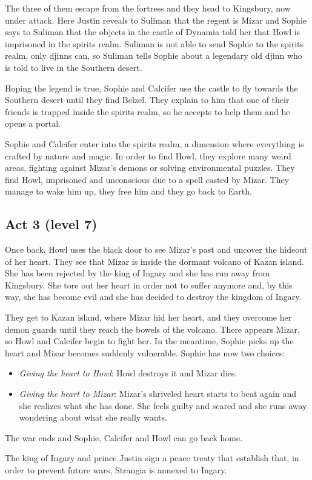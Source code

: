The three of them escape from the fortress and they head to Kingsbury, now under attack. Here Justin reveals to Suliman that the regent is Mizar and Sophie says to Suliman that the objects in the castle of Dynamia told her that Howl is imprisoned in the spirits realm. Suliman is not able to send Sophie to the spirits realm, only djinns can, so Suliman tells Sophie about a legendary old djinn who is told to live in the Southern desert.

Hoping the legend is true, Sophie and Calcifer use the castle to fly towards the Southern desert until they find Belzel. They explain to him that one of their friends is trapped inside the spirits realm, so he accepts to help them and he opens a portal.

Sophie and Calcifer enter into the spirits realm, a dimension where everything is crafted by nature and magic. In order to find Howl, they explore many weird areas, fighting against Mizar's demons or solving environmental puzzles. They find Howl, imprisoned and unconscious due to a spell casted by Mizar. They manage to wake him up, they free him and they go back to Earth.

\subsection*{Act 3 (level 7)}
Once back, Howl uses the black door to see Mizar's past and uncover the hideout of her heart. They see that Mizar is inside the dormant volcano of Kazan island. She has been rejected by the king of Ingary and she has run away from Kingsbury. She tore out her heart in order not to suffer anymore and, by this way, she has become evil and she has decided to destroy the kingdom of Ingary.

They get to Kazan island, where Mizar hid her heart, and they overcome her demon guards until they reach the bowels of the volcano. There appears Mizar, so Howl and Calcifer begin to fight her. In the meantime, Sophie picks up the heart and Mizar becomes suddenly vulnerable. Sophie has now two choices:
\begin{itemize}
\item \textit{Giving the heart to Howl}: Howl destroys it and Mizar dies.
\item \textit{Giving the heart to Mizar}: Mizar's shriveled heart starts to beat again and she realizes what she has done. She feels guilty and scared and she runs away wondering about what she really wants.
\end{itemize} 

The war ends and Sophie, Calcifer and Howl can go back home.

The king of Ingary and prince Justin sign a peace treaty that establish that, in order to prevent future wars, Strangia is annexed to Ingary.
